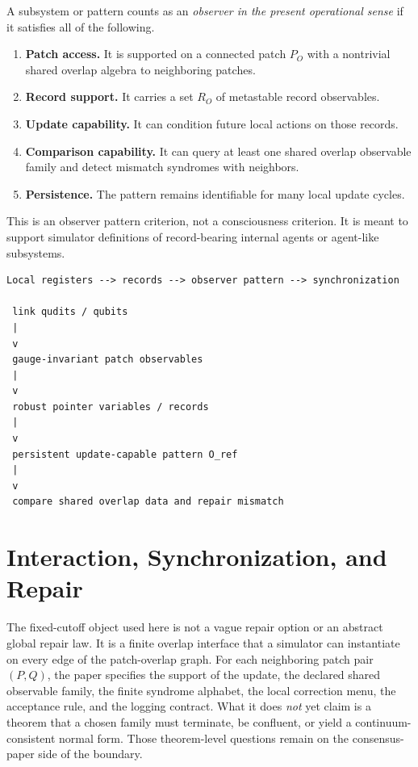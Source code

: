 \documentclass[11pt]{article}
\begin{document}
A subsystem or pattern counts as an \emph{observer in the present operational sense} if it
satisfies all of the following.
\begin{enumerate}[leftmargin=2em]
\item \textbf{Patch access.} It is supported on a connected patch $P_O$ with a nontrivial
shared overlap algebra to neighboring patches.
\item \textbf{Record support.} It carries a set $R_O$ of metastable record observables.
\item \textbf{Update capability.} It can condition future local actions on those records.
\item \textbf{Comparison capability.} It can query at least one shared overlap observable
family and detect mismatch syndromes with neighbors.
\item \textbf{Persistence.} The pattern remains identifiable for many local update cycles.
\end{enumerate}

This is an observer pattern criterion, not a consciousness criterion. It is meant to support
simulator definitions of record-bearing internal agents or agent-like subsystems.

\begin{verbatim}
Local registers --> records --> observer pattern --> synchronization

 link qudits / qubits
 |
 v
 gauge-invariant patch observables
 |
 v
 robust pointer variables / records
 |
 v
 persistent update-capable pattern O_ref
 |
 v
 compare shared overlap data and repair mismatch
\end{verbatim}

\section{Interaction, Synchronization, and Repair}

The fixed-cutoff object used here is not a vague repair option or an abstract global repair law. It is a finite overlap interface that a simulator can instantiate
on every edge of the patch-overlap graph. For each neighboring patch
pair $(P,Q)$, the paper specifies the support of the update, the declared shared
observable family, the finite syndrome alphabet, the local correction menu, the acceptance rule,
and the logging contract. What it does \emph{not} yet claim is a theorem that a chosen family
must terminate, be confluent, or yield a continuum-consistent normal form. Those theorem-level
questions remain on the consensus-paper side of the boundary.
\end{document}
